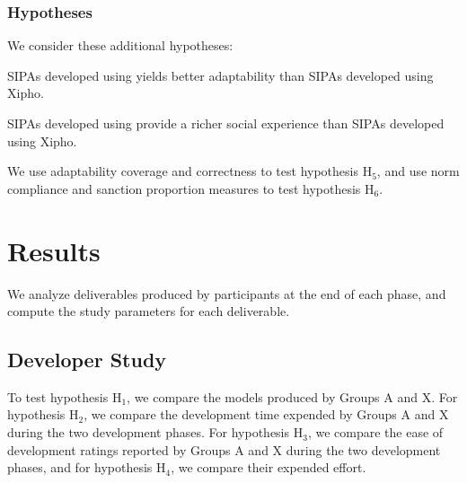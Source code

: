 \subsubsection*{Hypotheses}

We consider these additional hypotheses:

\bhypothesis

\item SIPAs developed using \frameworkA yields better adaptability
than SIPAs developed using Xipho.

\item SIPAs developed using \frameworkA provide a richer social
experience than SIPAs developed using Xipho.

\ehypothesis

We use adaptability coverage and correctness to test hypothesis
H$_5$, and use norm compliance and sanction proportion measures to test
hypothesis H$_6$.

\section{Results}
\label{sec:arnor-result}

We analyze deliverables produced by participants at the end of each
phase, and compute the study parameters for each deliverable.  

\subsection{Developer Study}

To test hypothesis H$_1$, we compare the models produced by Groups A and X.
For hypothesis H$_2$, we compare the development time expended by
Groups A and X during the two development phases. For
hypothesis H$_3$, we compare the ease of development ratings reported by
Groups A and X during the two development phases, and
for hypothesis H$_4$, we compare their expended effort.

